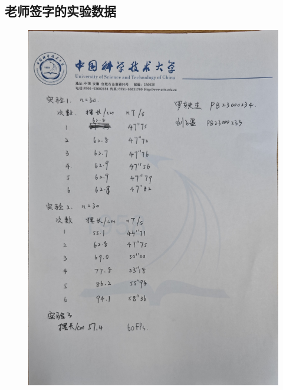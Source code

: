 \documentclass[a4paper]{extarticle}
\begin{document}
    \subsection*{老师签字的实验数据}
    \begin{figure}[H]
        \centering
        \includegraphics[width=\linewidth]{4.jpg}
    \end{figure}
\end{document}
